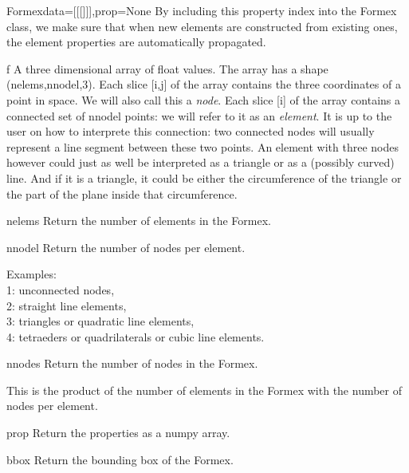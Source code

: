 {{\begin{classdesc}  {Formex}{data=[[[]]],prop=None}
By including this property index into the Formex class, we make sure that when new elements are constructed from existing ones, the element properties are automatically propagated.

\end{classdesc}

\begin{memberdesc}  [array]{f}
A three dimensional array of float values. The array has a shape (nelems,nnodel,3). Each slice [i,j] of the array contains the three coordinates of a point in space. We will also call this a \emph{node}. Each slice [i] of the array contains a connected set of nnodel points: we will refer to it as an \emph{element}. It is up to the user on how to interprete this connection: two connected nodes will usually represent a line segment between these two points. An element with three nodes however could just as well be interpreted as a triangle or as a (possibly curved) line. And if it is a triangle, it could be either the circumference of the triangle or the part of the plane inside that circumference.   
\end{memberdesc}

\begin{methoddesc}  {nelems}{}
Return the number of elements in the Formex.
\end{methoddesc}

\begin{methoddesc}  {nnodel}{}
Return the number of nodes per element.

Examples:\\
1: unconnected nodes,\\
2: straight line elements,\\
3: triangles or quadratic line elements,\\
4: tetraeders or quadrilaterals or cubic line elements.
\end{methoddesc}

\begin{methoddesc}  {nnodes}{}
Return the number of nodes in the Formex.

This is the product of the number of elements in the Formex with the number of nodes per element.
\end{methoddesc}

\begin{methoddesc}  {prop}{}
Return the properties as a numpy array.
\end{methoddesc}

\begin{methoddesc}  {bbox}{}
Return the bounding box of the Formex.


\end{methoddesc}}}
